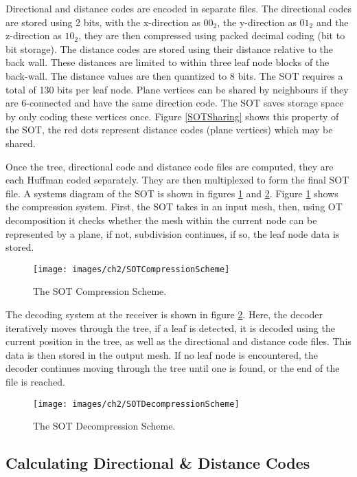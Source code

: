 Directional and distance codes are encoded in separate files. The directional codes are stored using 2 bits, with the x-direction as $00_2$, the y-direction as $01_2$ and the z-direction as $10_2$, they are then compressed using packed decimal coding (bit to bit storage). The distance codes are stored using their distance relative to the back wall. These distances are limited to within three leaf node blocks of the back-wall. The distance values are then quantized to 8 bits. The SOT requires a total of 130 bits per leaf node. Plane vertices can be shared by neighbours if they are 6-connected and have the same direction code. The SOT saves storage space by only coding these vertices once. Figure \ref{SOTSharing} shows this property of the SOT, the red dots represent distance codes (plane vertices) which may be shared.

Once the tree, directional code and distance code files are computed, they are each Huffman coded separately. They are then multiplexed to form the final SOT file. A systems diagram of the SOT is shown in figures \ref{SOTCompressionScheme} and \ref{SOTDecompressionScheme}. Figure \ref{SOTCompressionScheme} shows the compression system. First, the SOT takes in an input mesh, then, using OT decomposition it checks whether the mesh within the current node can be represented by a plane, if not, subdivision continues, if so, the leaf node data is stored. 

\begin{figure}[!h]
\centering
\texttt{[image: images/ch2/SOTCompressionScheme]}
\caption{The SOT Compression Scheme.}
\label{SOTCompressionScheme}
\end{figure}

The decoding system at the receiver is shown in figure \ref{SOTDecompressionScheme}. Here, the decoder iteratively moves through the tree, if a leaf is detected, it is decoded using the current position in the tree, as well as the directional and distance code files. This data is then stored in the output mesh. If no leaf node is encountered, the decoder continues moving through the tree until one is found, or the end of the file is reached.

\begin{figure}[!h]
\centering
\texttt{[image: images/ch2/SOTDecompressionScheme]}
\caption{The SOT Decompression Scheme.}
\label{SOTDecompressionScheme}
\end{figure}

\subsection{Calculating Directional \& Distance Codes}

